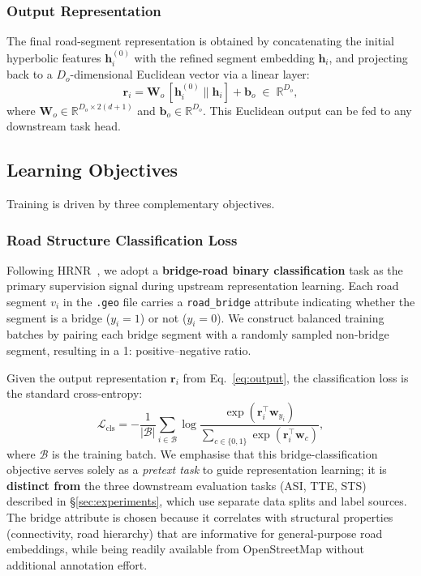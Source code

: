 \subsubsection{Output Representation}\label{subsubsec:output}

The final road-segment representation is obtained by concatenating the initial hyperbolic features $\mathbf{h}_i^{(0)}$ with the refined segment embedding $\mathbf{h}_i$,
and projecting back to a $D_o$-dimensional Euclidean vector via a linear layer:
\begin{equation}\label{eq:output}
  \mathbf{r}_i = \mathbf{W}_o\,[\mathbf{h}_i^{(0)} \| \mathbf{h}_i] + \mathbf{b}_o
  \;\in\; \mathbb{R}^{D_o},
\end{equation}
where $\mathbf{W}_o \in \mathbb{R}^{D_o \times 2(d+1)}$ and $\mathbf{b}_o \in \mathbb{R}^{D_o}$.
This Euclidean output can be fed to any downstream task head.

\subsection{Learning Objectives}\label{subsec:loss}

Training is driven by three complementary objectives.

\subsubsection{Road Structure Classification Loss}\label{subsubsec:cls_loss}

Following HRNR~\cite{hrnr}, we adopt a \textbf{bridge-road binary classification} task as the primary supervision signal during upstream representation learning.
Each road segment $v_i$ in the \texttt{.geo} file carries a \texttt{road\_bridge} attribute indicating whether the segment is a bridge ($y_i{=}1$) or not ($y_i{=}0$).
We construct balanced training batches by pairing each bridge segment with a randomly sampled non-bridge segment, resulting in a 1\!: positive--negative ratio.

Given the output representation $\mathbf{r}_i$ from Eq.~\eqref{eq:output},
the classification loss is the standard cross-entropy:
\begin{equation}\label{eq:loss_cls}
  \mathcal{L}_{\text{cls}}
  = -\frac{1}{|\mathcal{B}|} \sum_{i \in \mathcal{B}}
    \log \frac{\exp(\mathbf{r}_i^\top \mathbf{w}_{y_i})}
         {\sum_{c \in \{0,1\}} \exp(\mathbf{r}_i^\top \mathbf{w}_{c})},
\end{equation}
where $\mathcal{B}$ is the training batch.
We emphasise that this bridge-classification objective serves solely as a \emph{pretext task} to guide representation learning;
it is \textbf{distinct from} the three downstream evaluation tasks (ASI, TTE, STS) described in \S\ref{sec:experiments}, which use separate data splits and label sources.
The bridge attribute is chosen because it correlates with structural properties (connectivity, road hierarchy) that are informative for general-purpose road embeddings,
while being readily available from OpenStreetMap without additional annotation effort.

